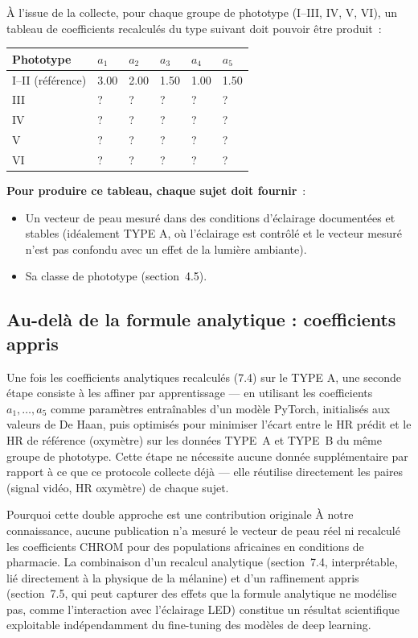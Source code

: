 \documentclass[11pt,a4paper]{article}
\begin{document}
\`A l'issue de la collecte, pour chaque groupe de phototype (I--III, IV, V,
VI), un tableau de coefficients recalcul\'es du type suivant doit pouvoir
\^etre produit~:

\begin{center}
\begin{tabularx}{\textwidth}{P{2.5cm} P{1.4cm} P{1.4cm} P{1.4cm} P{1.4cm}
P{1.4cm}}
\toprule
\textbf{Phototype} & $a_1$ & $a_2$ & $a_3$ & $a_4$ & $a_5$ \\
\midrule
I--II (r\'ef\'erence) & 3.00 & 2.00 & 1.50 & 1.00 & 1.50 \\
III & ? & ? & ? & ? & ? \\
IV & ? & ? & ? & ? & ? \\
V & ? & ? & ? & ? & ? \\
VI & ? & ? & ? & ? & ? \\
\bottomrule
\end{tabularx}
\end{center}

\textbf{Pour produire ce tableau, chaque sujet doit fournir}~:
\begin{itemize}
\item Un vecteur de peau mesur\'e dans des conditions d'\'eclairage
document\'ees et stables (id\'ealement TYPE A, o\`u l'\'eclairage est
contr\^ol\'e et le vecteur mesur\'e n'est pas confondu avec un effet de la
lumi\`ere ambiante).
\item Sa classe de phototype (section~4.5).
\end{itemize}

\subsection{Au-del\`a de la formule analytique : coefficients appris}

Une fois les coefficients analytiques recalcul\'es (7.4) sur le TYPE A, une
seconde \'etape consiste \`a les affiner par apprentissage --- en utilisant
les coefficients $a_1, \ldots, a_5$ comme param\`etres entra\^inables d'un
mod\`ele PyTorch, initialis\'es aux valeurs de De Haan, puis optimis\'es pour
minimiser l'\'ecart entre le HR pr\'edit et le HR de r\'ef\'erence (oxym\`etre)
sur les donn\'ees TYPE~A et TYPE~B du m\^eme groupe de phototype. Cette
\'etape ne n\'ecessite aucune donn\'ee suppl\'ementaire par rapport \`a ce
que ce protocole collecte d\'ej\`a --- elle r\'eutilise directement les
paires (signal vid\'eo, HR oxym\`etre) de chaque sujet.

\begin{notebox}{Pourquoi cette double approche est une contribution
originale}
\`A notre connaissance, aucune publication n'a mesur\'e le vecteur de peau
r\'eel ni recalcul\'e les coefficients CHROM pour des populations africaines
en conditions de pharmacie. La combinaison d'un recalcul analytique
(section~7.4, interpr\'etable, li\'e directement \`a la physique de la
m\'elanine) et d'un raffinement appris (section~7.5, qui peut capturer des
effets que la formule analytique ne mod\'elise pas, comme l'interaction avec
l'\'eclairage LED) constitue un r\'esultat scientifique exploitable
ind\'ependamment du fine-tuning des mod\`eles de deep learning.
\end{notebox}
\end{document}
